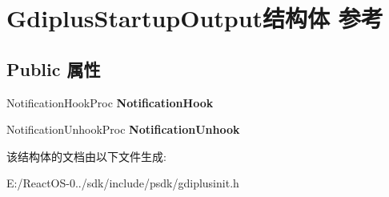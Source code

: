 \hypertarget{struct_gdiplus_startup_output}{}\section{Gdiplus\+Startup\+Output结构体 参考}
\label{struct_gdiplus_startup_output}
\subsection*{Public 属性}
\begin{DoxyCompactItemize}
\item 
\mbox{\label{struct_gdiplus_startup_output_a8237b31d85480655ef07d22081ecfdad}} 
Notification\+Hook\+Proc {\bfseries Notification\+Hook}
\item 
\mbox{\label{struct_gdiplus_startup_output_a0f25455db49f03a3aa0f48bc58f52c89}} 
Notification\+Unhook\+Proc {\bfseries Notification\+Unhook}
\end{DoxyCompactItemize}


该结构体的文档由以下文件生成\+:\begin{DoxyCompactItemize}
\item 
E\+:/\+React\+O\+S-\/0../sdk/include/psdk/gdiplusinit.\+h\end{DoxyCompactItemize}

